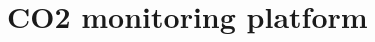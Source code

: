 \chapter{CO2 monitoring platform}
\renewcommand{\headrulewidth}{0pt}
\lhead[\thepage]{\leftmark}
\rhead[\leftmark]{\thepage}
\cfoot[]{}
